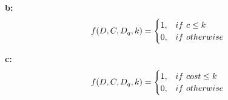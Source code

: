 \documentclass[12pt,a4paper]{article}
\theoremstyle{definition}
\begin{document}
\begin{enumerate}
\textbf{b:}
\begin{eqnarray}f(D,C,D_q,k)=
	\begin{cases}
	1, &if\ c\le k\cr 
	0, &if\ otherwise
	\end{cases}
	\end{eqnarray}

\textbf{c:}
\begin{eqnarray}f(D,C,D_q,k)=
	\begin{cases}
	1, &if\ cost\le k\cr 
	0, &if\ otherwise
	\end{cases}
	\end{eqnarray}

\end{enumerate}


\end{document}
